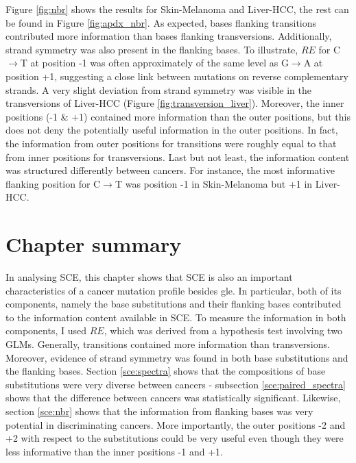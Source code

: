 Figure \ref{fig:nbr} shows the results for Skin-Melanoma and Liver-HCC, the rest can be found in Figure \ref{fig:apdx_nbr}. As expected, bases flanking transitions contributed more information than bases flanking transversions. Additionally, strand symmetry was also present in the flanking bases. To illustrate, $RE$ for C$\rightarrow$T at position -1 was often approximately of the same level as G$\rightarrow$A at position +1, suggesting a close link between mutations on reverse complementary strands. A very slight deviation from strand symmetry was visible in the transversions of Liver-HCC (Figure \ref{fig:transversion_liver}). Moreover, the inner positions (-1 \& +1) contained more information than the outer positions, but this does not deny the potentially useful information in the outer positions. In fact, the information from outer positions for transitions were roughly equal to that from inner positions for transversions. Last but not least, the information content was structured differently between cancers. For instance, the most informative flanking position for C$\rightarrow$T was position -1 in Skin-Melanoma but +1 in Liver-HCC.


\section{Chapter summary}
In analysing SCE, this chapter shows that SCE is also an important characteristics of a cancer mutation profile besides \gls{gle}. In particular, both of its components, namely the base substitutions and their flanking bases contributed to the information content available in SCE. To measure the information in both components, I used $RE$, which was derived from a hypothesis test involving two GLMs. Generally, transitions contained more information than transversions. Moreover, evidence of strand symmetry was found in both base substitutions and the flanking bases. Section \ref{sce:spectra} shows that the compositions of base substitutions were very diverse between cancers - subsection \ref{sce:paired_spectra} shows that the difference between cancers was statistically significant. Likewise, section \ref{sce:nbr} shows that the information from flanking bases was very potential in discriminating cancers. More importantly, the outer positions -2 and +2 with respect to the substitutions could be very useful even though they were less informative than the inner positions -1 and +1.